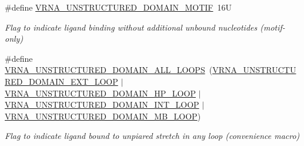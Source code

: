 \begin{DoxyCompactItemize}
\mbox{\label{group__domains__up_gaab12b58d59be76446a9f76fad2fe624c}} 
\#define \hyperlink{group__domains__up_gaab12b58d59be76446a9f76fad2fe624c}{V\+R\+N\+A\+\_\+\+U\+N\+S\+T\+R\+U\+C\+T\+U\+R\+E\+D\+\_\+\+D\+O\+M\+A\+I\+N\+\_\+\+M\+O\+T\+IF}~16U
\begin{DoxyCompactList}\small\item\em Flag to indicate ligand binding without additional unbound nucleotides (motif-\/only) \end{DoxyCompactList}\item 
\mbox{\label{group__domains__up_ga3c6be4cce70f1af9e885788856101699}} 
\#define \hyperlink{group__domains__up_ga3c6be4cce70f1af9e885788856101699}{V\+R\+N\+A\+\_\+\+U\+N\+S\+T\+R\+U\+C\+T\+U\+R\+E\+D\+\_\+\+D\+O\+M\+A\+I\+N\+\_\+\+A\+L\+L\+\_\+\+L\+O\+O\+PS}~(\hyperlink{group__domains__up_gaac911374e86236a51bfd42e1f098eaba}{V\+R\+N\+A\+\_\+\+U\+N\+S\+T\+R\+U\+C\+T\+U\+R\+E\+D\+\_\+\+D\+O\+M\+A\+I\+N\+\_\+\+E\+X\+T\+\_\+\+L\+O\+OP} $\vert$ \hyperlink{group__domains__up_ga23b610ea9564346c45cc1e2bbb62adf7}{V\+R\+N\+A\+\_\+\+U\+N\+S\+T\+R\+U\+C\+T\+U\+R\+E\+D\+\_\+\+D\+O\+M\+A\+I\+N\+\_\+\+H\+P\+\_\+\+L\+O\+OP} $\vert$ \hyperlink{group__domains__up_gac4a0feccd9654c149203200248c2716b}{V\+R\+N\+A\+\_\+\+U\+N\+S\+T\+R\+U\+C\+T\+U\+R\+E\+D\+\_\+\+D\+O\+M\+A\+I\+N\+\_\+\+I\+N\+T\+\_\+\+L\+O\+OP} $\vert$ \hyperlink{group__domains__up_ga67b80796655e5227a4ed662bfbe398b0}{V\+R\+N\+A\+\_\+\+U\+N\+S\+T\+R\+U\+C\+T\+U\+R\+E\+D\+\_\+\+D\+O\+M\+A\+I\+N\+\_\+\+M\+B\+\_\+\+L\+O\+OP})
\begin{DoxyCompactList}\small\item\em Flag to indicate ligand bound to unpiared stretch in any loop (convenience macro) \end{DoxyCompactList}\end{DoxyCompactItemize}
